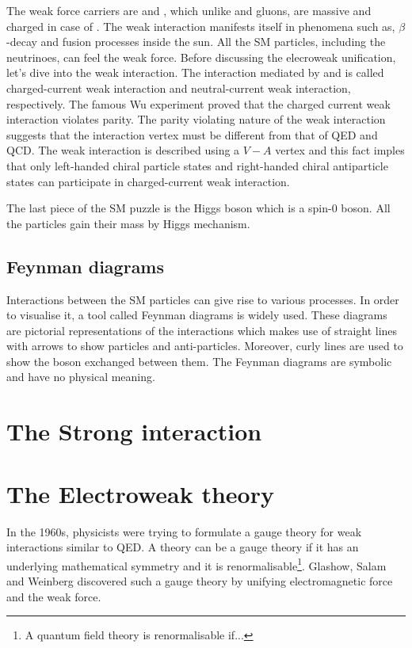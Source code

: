 The weak force carriers are \PWpm and \PZ, which unlike \Pphoton and 
gluons, are massive and charged in case of \PWpm. The weak interaction manifests
itself in phenomena such as, $\beta$-decay and fusion processes inside the sun. All the
SM particles, including the neutrinoes, can feel the weak force. 
Before discussing the elecroweak unification, let's dive into the weak interaction. 
The interaction mediated by \PWpm and \PZ is called charged-current weak interaction and
neutral-current weak interaction, respectively. The famous Wu experiment proved that the charged
current weak interaction violates parity. The parity violating nature of the weak interaction
suggests that the interaction vertex must be different from that of QED and QCD. The weak 
interaction is described using a $V-A$ vertex and this fact imples that only left-handed
chiral particle states and right-handed chiral antiparticle states can participate in 
charged-current weak interaction. 

The last piece of the SM puzzle is the Higgs boson which is a spin-0 boson. All the
particles gain their mass by Higgs mechanism. 

\subsection{Feynman diagrams}

Interactions between the SM particles can give rise to various processes. In order to
visualise it, a tool called Feynman diagrams is widely used. These diagrams are 
pictorial representations of the interactions which makes use of straight lines with 
arrows to show particles and anti-particles. Moreover, curly lines are used to show
the boson exchanged between them. The Feynman diagrams are symbolic and have no 
physical meaning. 

\section{The Strong interaction}

\section{The Electroweak theory}
In the 1960s, physicists were trying to formulate a gauge theory for weak interactions
similar to QED. A theory can be a gauge theory if it has an underlying mathematical symmetry
and it is renormalisable\footnote{A quantum field theory is renormalisable if...}. Glashow,
Salam and Weinberg discovered such a gauge theory by unifying electromagnetic force and 
the weak force.

